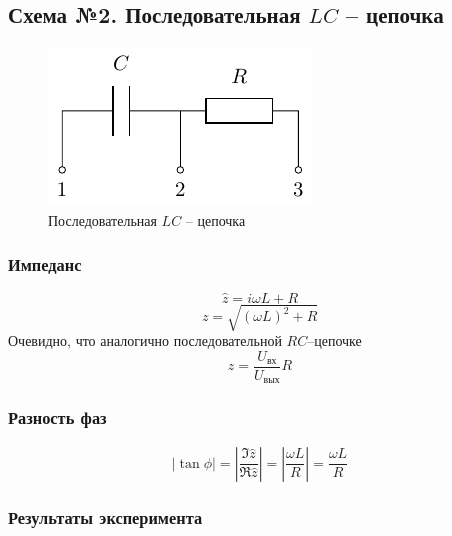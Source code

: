 \subsection{Схема №2. Последовательная $LC$ -- цепочка}
\begin{figure}[H]
	\centering
	\includegraphics[]{chems/chem1}
	\caption{Последовательная $LC$ -- цепочка}
	\label{fig:LC}
\end{figure}

\subsubsection{Импеданс}
\begin{equation}
	\hat{z}=i\omega L+R
\end{equation}
\begin{equation}
	z=\sqrt{(\omega L)^2+R}
\end{equation}
Очевидно, что аналогично последовательной $RC$--цепочке
\begin{equation}
	z=\frac{U_\text{вх}}{U_\text{вых}}R
\end{equation}
\subsubsection{Разность фаз}
\begin{equation}
	\left|\tan\phi\right| = \left|\frac{\Im\hat{z}}{\Re\hat{z}}\right|=
	\left|\frac{
		\omega L
	}{
		R
	}\right|=
	\frac{
		\omega L
	}{
		R
	}	
\end{equation}

\subsubsection{Результаты эксперимента}

